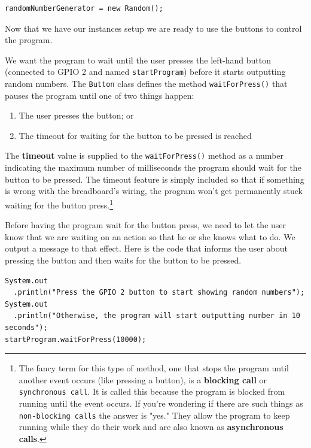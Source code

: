 \beforeverb
\begin{verbatim}
randomNumberGenerator = new Random();
\end{verbatim}
\afterverb

Now that we have our instances setup we are ready to use the buttons to control the program. 

We want the program to wait until the user presses the left-hand button (connected to GPIO 2 and named \texttt{startProgram}) before it starts outputting random numbers. The \texttt{Button} class defines the method \texttt{waitForPress()} that pauses the program until one of two things happen:

\begin{enumerate}
	\item The user presses the button; or
	\item The timeout for waiting for the button to be pressed is reached
\end{enumerate}

The \textbf{timeout} value is supplied to the \texttt{waitForPress()} method as a number indicating the maximum number of milliseconds the program should wait for the button to be pressed. The timeout feature is simply included so that if something is wrong with the breadboard's wiring, the program won't get permanently stuck waiting for the button press.\footnote{The fancy term for this type of method, one that stops the program until another event occurs (like pressing a button), is a \textbf{blocking call} or \texttt{synchronous call}. It is called this because the program is blocked from running until the event occurs. If you're wondering if there are such things as \texttt{non-blocking calls} the answer is "yes." They allow the program to keep running while they do their work and are also known as \textbf{asynchronous calls}.}

Before having the program wait for the button press, we need to let the user know that we are waiting on an action so that he or she knows what to do. We output a message to that effect. Here is the code that informs the user about pressing the button and then waits for the button to be pressed.


\beforeverb
\begin{verbatim}
System.out
  .println("Press the GPIO 2 button to start showing random numbers");
System.out
  .println("Otherwise, the program will start outputting number in 10 seconds");
startProgram.waitForPress(10000);
\end{verbatim}
\afterverb

